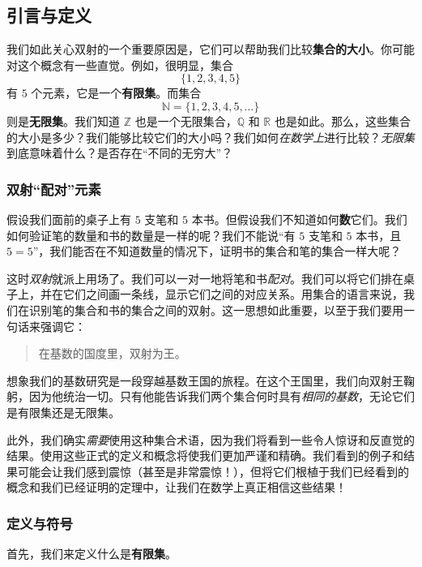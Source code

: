 
\subsection{引言与定义}

我们如此关心双射的一个重要原因是，它们可以帮助我们比较\textbf{集合的大小}。你可能对这个概念有一些直觉。例如，很明显，集合
\[\{1, 2, 3, 4, 5\}\]
有 $5$ 个元素，它是一个\textbf{有限集}。而集合
\[\mathbb{N} = \{1, 2, 3, 4, 5, \dots \}\]
则是\textbf{无限集}。我们知道 $\mathbb{Z}$ 也是一个无限集合，$\mathbb{Q}$ 和 $\mathbb{R}$ 也是如此。那么，这些集合的大小是多少？我们能够比较它们的大小吗？我们如何\emph{在数学上}进行比较？\emph{无限集}到底意味着什么？是否存在``不同的无穷大''？

\subsubsection*{双射``配对''元素}

假设我们面前的桌子上有 $5$ 支笔和 $5$ 本书。但假设我们不知道如何\textbf{数}它们。我们如何验证笔的数量和书的数量是一样的呢？我们不能说``有 $5$ 支笔和 $5$ 本书，且 $5 = 5$''，我们能否在不知道数量的情况下，证明书的集合和笔的集合一样大呢？

这时\emph{双射}就派上用场了。我们可以一对一地将笔和书\emph{配对}。我们可以将它们排在桌子上，并在它们之间画一条线，显示它们之间的对应关系。用集合的语言来说，我们在识别笔的集合和书的集合之间的双射。这一思想如此重要，以至于我们要用一句话来强调它：

\begin{quotation}
    \large{在基数的国度里，双射为王。}
\end{quotation}

想象我们的基数研究是一段穿越基数王国的旅程。在这个王国里，我们向双射王鞠躬，因为他统治一切。只有他能告诉我们两个集合何时具有\emph{相同的基数}，无论它们是有限集还是无限集。

此外，我们确实\emph{需要}使用这种集合术语，因为我们将看到一些令人惊讶和反直觉的结果。使用这些正式的定义和概念将使我们更加严谨和精确。我们看到的例子和结果可能会让我们感到震惊（甚至是非常震惊！），但将它们根植于我们已经看到的概念和我们已经证明的定理中，让我们在数学上真正相信这些结果！

\subsubsection*{定义与符号}

首先，我们来定义什么是\textbf{有限集}。

